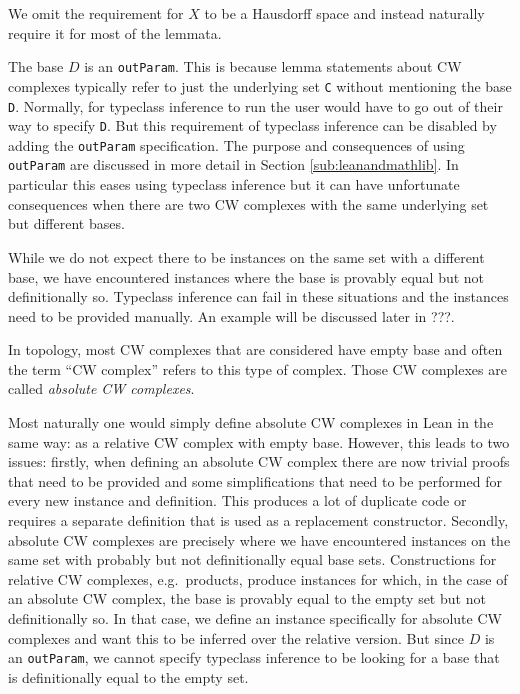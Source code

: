 We omit the requirement for $X$ to be a Hausdorff space and instead naturally require it for most of the lemmata. 

The base $D$ is an \lstinline|outParam|. 
This is because lemma statements about CW complexes typically refer to just the underlying set \lstinline|C| without mentioning the base \lstinline|D|. 
Normally, for typeclass inference to run the user would have to go out of their way to specify \lstinline|D|. 
But this requirement of typeclass inference can be disabled by adding the \lstinline|outParam| specification.
The purpose and consequences of using \lstinline|outParam| are discussed in more detail in Section \ref{sub:leanandmathlib}.
In particular this eases using typeclass inference but it can have unfortunate consequences when there are two CW complexes with the same underlying set but different bases.

While we do not expect there to be instances on the same set with a different base, we have encountered instances where the base is provably equal but not definitionally so. 
Typeclass inference can fail in these situations and the instances need to be provided manually. 
An example will be discussed later in ???. 

In topology, most CW complexes that are considered have empty base and often the term ``CW complex'' refers to this type of complex. 
Those CW complexes are called \emph{absolute CW complexes}. 

Most naturally one would simply define absolute CW complexes in Lean in the same way: as a relative CW complex with empty base. 
However, this leads to two issues: 
firstly, when defining an absolute CW complex there are now trivial proofs that need to be provided and some simplifications that need to be performed for every new instance and definition. 
This produces a lot of duplicate code or requires a separate definition that is used as a replacement constructor. 
Secondly, absolute CW complexes are precisely where we have encountered instances on the same set with probably but not definitionally equal base sets. 
Constructions for relative CW complexes, e.g.\ products, produce instances for which, in the case of an absolute CW complex, the base is provably equal to the empty set but not definitionally so. 
In that case, we define an instance specifically for absolute CW complexes and want this to be inferred over the relative version. 
But since $D$ is an \lstinline|outParam|, we cannot specify typeclass inference to be looking for a base that is definitionally equal to the empty set. 


